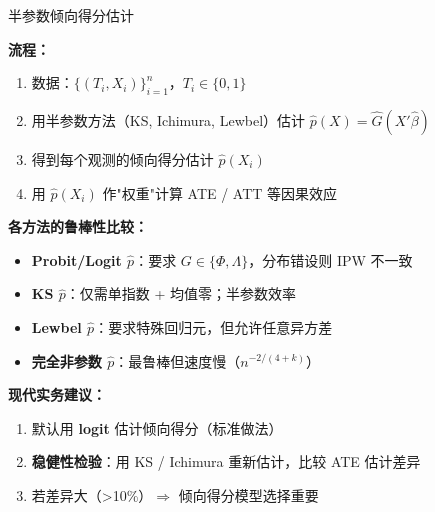 \documentclass[aspectratio=169, 10pt]{beamer}
\begin{document}
\begin{frame}{半参数倾向得分估计}

  \textbf{流程：}
  \begin{enumerate}\setlength{\itemsep}{1pt}
    \item 数据：$\{(T_i, X_i)\}_{i=1}^n$，$T_i \in \{0, 1\}$
    \item 用半参数方法（KS, Ichimura, Lewbel）估计 $\hat p(X) = \hat G(X'\hat\beta)$
    \item 得到每个观测的倾向得分估计 $\hat p(X_i)$
    \item 用 $\hat p(X_i)$ 作"权重"计算 ATE / ATT 等因果效应
  \end{enumerate}

  \begin{highlightbox}
    \textbf{各方法的鲁棒性比较：}
    \begin{itemize}\setlength{\itemsep}{1pt}
      \item \textbf{Probit/Logit $\hat p$}：要求 $G \in \{\Phi, \Lambda\}$，分布错设则 IPW 不一致
      \item \textbf{KS $\hat p$}：仅需单指数 + 均值零；半参数效率
      \item \textbf{Lewbel $\hat p$}：要求特殊回归元，但允许任意异方差
      \item \textbf{完全非参数 $\hat p$}：最鲁棒但速度慢（$n^{-2/(4+k)}$）
    \end{itemize}
  \end{highlightbox}

  \begin{keybox}
    \textbf{现代实务建议：}
    \begin{enumerate}\setlength{\itemsep}{1pt}
      \item 默认用 \textbf{logit} 估计倾向得分（标准做法）
      \item \textbf{稳健性检验}：用 KS / Ichimura 重新估计，比较 ATE 估计差异
      \item 若差异大（>10\%）$\Rightarrow$ 倾向得分模型选择重要
    \end{enumerate}
  \end{keybox}

\end{frame}
\end{document}

